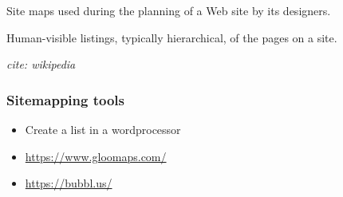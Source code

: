 Site maps used during the planning of a Web site by its designers.

Human-visible listings, typically hierarchical, of the pages on a site.

\textit{cite: wikipedia}

\subsubsection{Sitemapping tools}

\begin{itemize}
    \item Create a list in a wordprocessor
    \item \href{https://www.gloomaps.com/}{https://www.gloomaps.com/}
    \item \href{https://bubbl.us/}{https://bubbl.us/}
\end{itemize}

